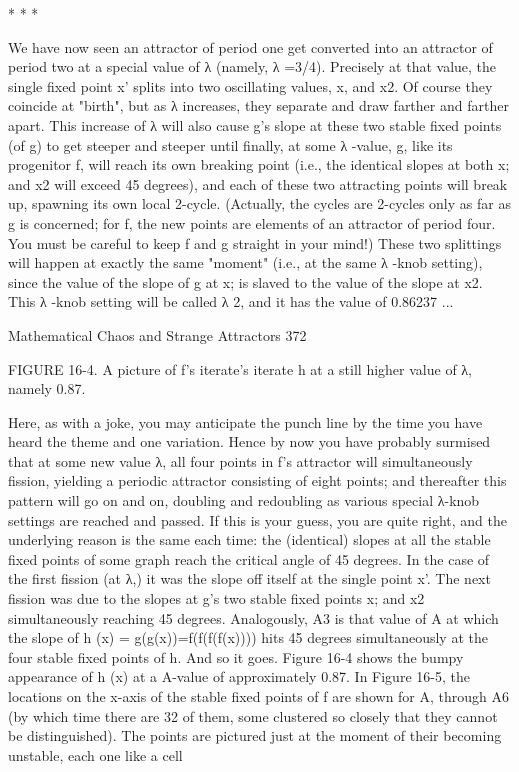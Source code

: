                                          *   *   *

          We have now seen an attractor of period one get converted into an attractor of
period two at a special value of λ (namely, λ =3/4). Precisely at that value, the single
fixed point x' splits into two oscillating values, x, and x2. Of course they coincide at
"birth", but as λ increases, they separate and draw farther and farther apart. This
increase of λ will also cause g's slope at these two stable fixed points (of g) to get
steeper and steeper until finally, at some λ -value, g, like its progenitor f, will reach its
own breaking point (i.e., the identical slopes at both x; and x2 will exceed 45
degrees), and each of these two attracting points will break up, spawning its own local
2-cycle. (Actually, the cycles are 2-cycles only as far as g is concerned; for f, the new
points are elements of an attractor of period four. You must be careful to keep f and g
straight in your mind!) These two splittings will happen at exactly the same "moment"
(i.e., at the same λ -knob setting), since the value of the slope of g at x; is slaved to the
value of the slope at x2. This λ -knob setting will be called λ 2, and it has the value of
0.86237 ...




Mathematical Chaos and Strange Attractors                                               372

FIGURE 16-4. A picture of f's iterate's iterate h at a still higher value of λ, namely
0.87.

         Here, as with a joke, you may anticipate the punch line by the time you have
heard the theme and one variation. Hence by now you have probably surmised that at
some new value λ, all four points in f's attractor will simultaneously fission, yielding a
periodic attractor consisting of eight points; and thereafter this pattern will go on and
on, doubling and redoubling as various special λ-knob settings are reached and
passed. If this is your guess, you are quite right, and the underlying reason is the same
each time: the (identical) slopes at all the stable fixed points of some graph reach the
critical angle of 45 degrees. In the case of the first fission (at λ,) it was the slope off
itself at the single point x'. The next fission was due to the slopes at g's two stable
fixed points x; and x2 simultaneously reaching 45 degrees. Analogously, A3 is that
value of A at which the slope of h (x) = g(g(x))=f(f(f(f(x)))) hits 45 degrees
simultaneously at the four stable fixed points of h. And so it goes. Figure 16-4 shows
the bumpy appearance of h (x) at a A-value of approximately 0.87.
         In Figure 16-5, the locations on the x-axis of the stable fixed points of f are
shown for A, through A6 (by which time there are 32 of them, some clustered so
closely that they cannot be distinguished). The points are pictured just at the moment
of their becoming unstable, each one like a cell




